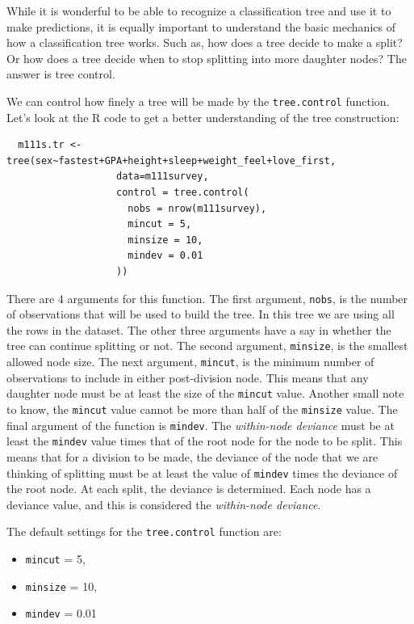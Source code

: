 \documentclass[12pt,twoside]{reedthesis}
\providecommand{\tightlist}{%
  \setlength{\itemsep}{0pt}\setlength{\parskip}{0pt}}
\begin{document}
  While it is wonderful to be able to recognize a classification tree and
  use it to make predictions, it is equally important to understand the
  basic mechanics of how a classification tree works. Such as, how does a
  tree decide to make a split? Or how does a tree decide when to stop
  splitting into more daughter nodes? The answer is tree control.
  
  We can control how finely a tree will be made by the
  \texttt{tree.control} function. Let's look at the R code to get a better
  understanding of the tree construction:
  
  \begin{verbatim}
  m111s.tr <- tree(sex~fastest+GPA+height+sleep+weight_feel+love_first,
                   data=m111survey,
                   control = tree.control(
                     nobs = nrow(m111survey),
                     mincut = 5,
                     minsize = 10,
                     mindev = 0.01
                   ))
  \end{verbatim}
  
  There are 4 arguments for this function. The first argument,
  \texttt{nobs}, is the number of observations that will be used to build
  the tree. In this tree we are using all the rows in the dataset. The
  other three arguments have a say in whether the tree can continue
  splitting or not. The second argument, \texttt{minsize}, is the smallest
  allowed node size. The next argument, \texttt{mincut}, is the minimum
  number of observations to include in either post-division node. This
  means that any daughter node must be at least the size of the
  \texttt{mincut} value. Another small note to know, the \texttt{mincut}
  value cannot be more than half of the \texttt{minsize} value. The final
  argument of the function is \texttt{mindev}. The \emph{within-node
  deviance} must be at least the \texttt{mindev} value times that of the
  root node for the node to be split. This means that for a division to be
  made, the deviance of the node that we are thinking of splitting must be
  at least the value of \texttt{mindev} times the deviance of the root
  node. At each split, the deviance is determined. Each node has a
  deviance value, and this is considered the \emph{within-node deviance}.
  
  The default settings for the \texttt{tree.control} function are:
  
  \begin{itemize}
  \tightlist
  \item
    \texttt{mincut} = 5,
  \item
    \texttt{minsize} = 10,
  \item
    \texttt{mindev} = 0.01
  \end{itemize}
  
\end{document}
